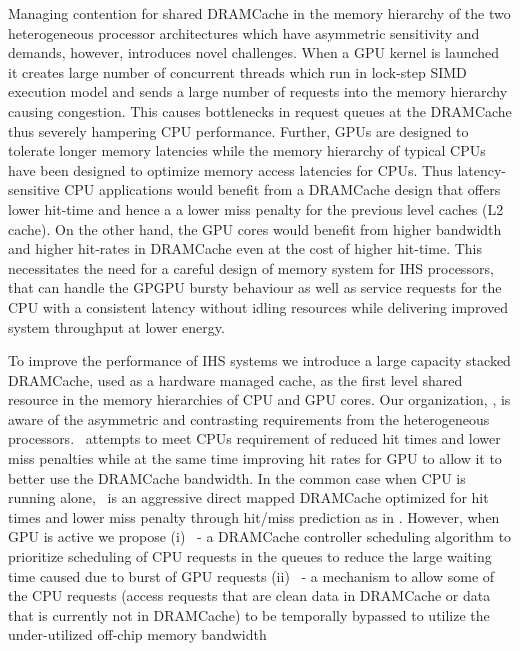 \par Managing contention for shared DRAMCache in the memory hierarchy of the two heterogeneous processor architectures which have asymmetric sensitivity and demands, however, introduces novel challenges. When a GPU kernel is launched it creates large number of concurrent threads which run in lock-step SIMD execution model and sends a large number of requests into the memory hierarchy causing congestion. This causes bottlenecks in request queues at the DRAMCache thus severely hampering CPU performance. Further, GPUs are designed to tolerate longer memory latencies while the memory hierarchy of typical CPUs have been designed to optimize memory access latencies for CPUs. 
Thus latency-sensitive CPU applications would benefit from a DRAMCache design that offers lower hit-time and hence a a lower miss penalty for the previous level caches (L2 cache). On the other hand, the GPU cores would benefit from higher bandwidth and higher hit-rates in DRAMCache even at the cost of higher hit-time. This necessitates the need for a careful design of memory system for IHS processors, that can handle the GPGPU bursty behaviour as well as service requests for the CPU with a consistent latency without idling resources while delivering improved system throughput at lower energy.
\par To improve the performance of IHS systems we introduce a large capacity stacked DRAMCache, used as a hardware managed cache, as the first level shared resource in the memory hierarchies of CPU and GPU cores. Our organization, \cachename, is aware of the asymmetric and contrasting requirements from the heterogeneous processors. \cachename\ attempts to meet CPUs requirement of reduced hit times and lower miss penalties while at the same time improving hit rates for GPU to allow it to better use the DRAMCache bandwidth. In the common case when CPU is running alone, \cachename\ is an aggressive direct mapped DRAMCache optimized for hit times and lower miss penalty through hit/miss prediction as in \cite{alloy}. However, when GPU is active we propose (i) \prioname\ - a DRAMCache controller scheduling algorithm to prioritize scheduling of CPU requests in the queues to reduce the large waiting time caused due to burst of GPU requests (ii) \bypassname\ - a mechanism to allow some of the CPU requests (access requests that are clean data in DRAMCache or data that is currently not in DRAMCache) to be temporally bypassed to utilize the under-utilized off-chip memory bandwidth

